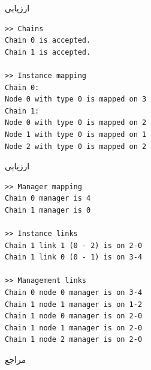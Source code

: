 \documentclass{beamer}
\begin{document}
\begin{persian}
\begin{frame}[fragile]{ارزیابی}
\begin{latin}
\begin{verbatim}
>> Chains
Chain 0 is accepted.
Chain 1 is accepted.
       
>> Instance mapping
Chain 0:
Node 0 with type 0 is mapped on 3
Chain 1:
Node 0 with type 0 is mapped on 2
Node 1 with type 0 is mapped on 1
Node 2 with type 0 is mapped on 2
    \end{verbatim}\end{latin}
\end{frame}
\begin{frame}[fragile]{ارزیابی} %
    \begin{latin}\begin{verbatim}
>> Manager mapping
Chain 0 manager is 4
Chain 1 manager is 0
       
>> Instance links
Chain 1 link 1 (0 - 2) is on 2-0
Chain 1 link 0 (0 - 1) is on 3-4
       
>> Management links
Chain 0 node 0 manager is on 3-4
Chain 1 node 1 manager is on 1-2
Chain 1 node 0 manager is on 2-0
Chain 1 node 1 manager is on 2-0
Chain 1 node 2 manager is on 2-0
    \end{verbatim}\end{latin}
\end{frame}
\begin{frame}[shrink=25]{مراجع} %
    \begin{latin}
    \printbibliography[heading=none]
    \end{latin}
\end{frame}
\end{persian}
\end{document}

